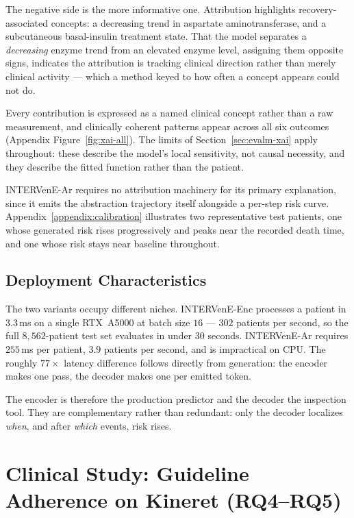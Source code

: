 The negative side is the more informative one. Attribution highlights recovery-associated concepts: a decreasing trend in aspartate aminotransferase, and a subcutaneous basal-insulin treatment state. That the model separates a \emph{decreasing} enzyme trend from an elevated enzyme level, assigning them opposite signs, indicates the attribution is tracking clinical direction rather than merely clinical activity --- which a method keyed to how often a concept appears could not do.

Every contribution is expressed as a named clinical concept rather than a raw measurement, and clinically coherent patterns appear across all six outcomes (Appendix Figure~\ref{fig:xai-all}). The limits of Section~\ref{sec:evalm-xai} apply throughout: these describe the model's local sensitivity, not causal necessity, and they describe the fitted function rather than the patient.

INTERVenE-Ar requires no attribution machinery for its primary explanation, since it emits the abstraction trajectory itself alongside a per-step risk curve. Appendix~\ref{appendix:calibration} illustrates two representative test patients, one whose generated risk rises progressively and peaks near the recorded death time, and one whose risk stays near baseline throughout.

\subsection{Deployment Characteristics}

The two variants occupy different niches. INTERVenE-Enc processes a patient in $3.3$\,ms on a single RTX~A5000 at batch size $16$ --- $302$ patients per second, so the full $8{,}562$-patient test set evaluates in under $30$ seconds. INTERVenE-Ar requires $255$\,ms per patient, $3.9$ patients per second, and is impractical on CPU. The roughly $77\times$ latency difference follows directly from generation: the encoder makes one pass, the decoder makes one per emitted token.

The encoder is therefore the production predictor and the decoder the inspection tool. They are complementary rather than redundant: only the decoder localizes \emph{when}, and after \emph{which} events, risk rises.

\section{Clinical Study: Guideline Adherence on Kineret (RQ4--RQ5)}
\label{sec:eval-clinical}

